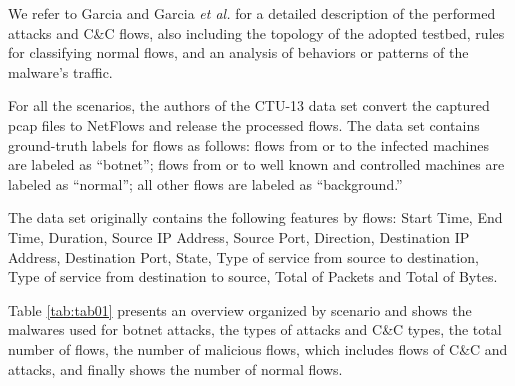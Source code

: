 \documentclass[review]{elsarticle}
\begin{document}
We refer to Garcia \cite{garcia2014identifying} and Garcia \emph{et al.} \cite{garcia2014empirical} for a detailed description of the performed attacks and C\&C flows, also including the topology of the adopted testbed, rules for classifying normal flows, and an analysis of behaviors or patterns of the malware's traffic.

For all the scenarios, the authors of the CTU-13 data set convert the captured pcap files to NetFlows and release the processed flows. The data set contains ground-truth labels for flows as follows: flows from or to the infected machines are labeled as “botnet”; flows from or to well known and controlled machines are labeled as “normal”; all other flows are labeled as “background.”

The data set originally contains the following features by flows:  Start Time, End Time, Duration, Source IP Address, Source Port, Direction, Destination IP Address, Destination Port, State, Type of service from source to destination, Type of service from destination to source, Total of Packets and Total of Bytes.

Table \ref{tab:tab01} presents an overview organized by scenario and shows the malwares used for botnet attacks, the types of attacks and C\&C types, the total number of flows, the number of malicious flows, which includes flows of C\&C and attacks, and finally shows the number of normal flows.
\end{document}
